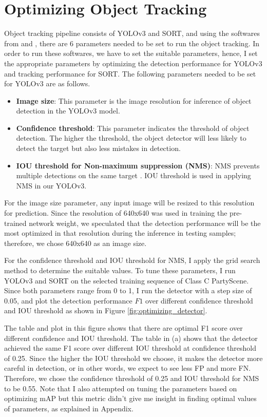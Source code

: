 \section{Optimizing Object Tracking}
\label{sec:methods/section_b}

Object tracking pipeline consists of YOLOv3 and SORT, and using the softwares from \cite{jocher_ultralyticsyolov3_2021} and \cite{abewley_abewleysort_2021}, there are 6 parameters needed to be set to run the object tracking. In order to run these softwares, we have to set the suitable parameters, hence, I set the appropriate parameters by optimizing the detection performance for YOLOv3 and tracking performance for SORT. The following parameters needed to be set for YOLOv3 are as follows.
\begin{itemize}
    \item \textbf{Image size}: This parameter is the image resolution for inference of object detection in the YOLOv3 model.
    \item \textbf{Confidence threshold}: This parameter indicates the threshold of object detection. The higher the threshold, the object detector will less likely to detect the target but also less mistakes in detection.
    \item \textbf{IOU threshold for Non-maximum suppression (NMS)}: NMS prevents multiple detections on the same target \cite{redmon_you_2016}. IOU threshold is used in applying NMS in our YOLOv3.
\end{itemize}
For the image size parameter, any input image will be resized to this resolution for prediction. Since the resolution of 640x640 was used in training the pre-trained network weight, we speculated that the detection performance will be the most optimized in that resolution during the inference in testing samples; therefore, we chose 640x640 as an image size.

For the confidence threshold and IOU threshold for NMS, I apply the grid search method to determine the suitable values. To tune these parameters, I run YOLOv3 and SORT on the selected training sequence of Class C PartyScene. Since both parameters range from 0 to 1, I run the detector with a step size of 0.05, and plot the detection performance $F1$ over different confidence threshold and IOU threshold as shown in Figure \ref{fig:optimizing_detector}.

The table and plot in this figure shows that there are optimal F1 score over different confidence and IOU threshold. The table in (a) shows that the detector achieved the same F1 score over different IOU threshold at confidence threshold of 0.25. Since the higher the IOU threshold we choose, it makes the detector more careful in detection, or in other words, we expect to see less FP and more FN. Therefore, we chose the confidence threshold of 0.25 and IOU threshold for NMS to be 0.55. Note that I also attempted on tuning the parameters based on optimizing mAP but this metric didn't give me insight in finding optimal values of parameters, as explained in Appendix.

